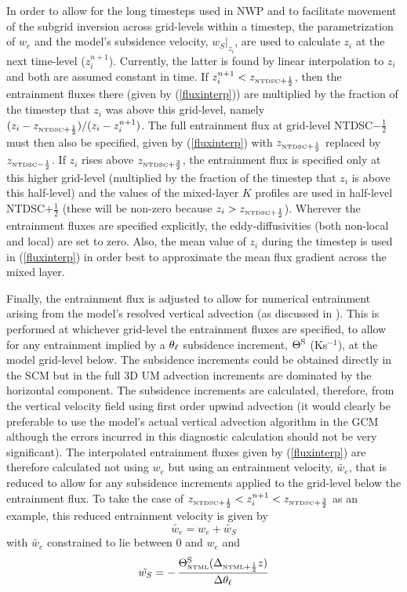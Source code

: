 \documentclass{UMDP_article}
\begin{document}
In order to allow for the long timesteps used in NWP and to facilitate
movement of the subgrid inversion across grid-levels within a
timestep, the parametrization of $w_e$ and the model's subsidence
velocity, $w_S|_{z_i}$, are used to calculate $z_i$ at the next
time-level ($z_i^{n+1}$).  Currently, the latter is found by linear
interpolation to $z_i$ and both are assumed constant in time.  If
$z_i^{n+1} < z_{\mbox{\tiny \rm NTDSC} +\frac{1}{2}}$, then the entrainment fluxes
there (given by (\ref{fluxinterp})) are multiplied by the fraction of
the timestep that $z_i$ was above this grid-level, namely
$(z_i-z_{\mbox{\tiny \rm NTDSC} +\frac{1}{2}})/(z_i - z_i^{n+1}) $.  The full
entrainment flux at grid-level NTDSC$-\frac{1}{2}$ must then also be
specified, given by (\ref{fluxinterp}) with $z_{\mbox{\tiny \rm NTDSC} + \frac{1}{2}}$
replaced by $z_{\mbox{\tiny \rm NTDSC} - \frac{1}{2}}$.  If $z_i$ rises above
$z_{\mbox{\tiny \rm NTDSC}+\frac{3}{2}}$, the entrainment flux is specified only at
this higher grid-level (multiplied by the fraction of the timestep
that $z_i$ is above this half-level) and the values of the mixed-layer
$K$ profiles are used in half-level NTDSC$+\frac{1}{2}$ (these will be
non-zero because $z_i>z_{\mbox{\tiny \rm NTDSC} + \frac{1}{2}}$).  Wherever the
entrainment fluxes are specified explicitly, the eddy-diffusivities
(both non-local and local) are set to zero.  Also, the mean value of
$z_i$ during the timestep is used in (\ref{fluxinterp}) in order best
to approximate the mean flux gradient across the mixed layer.

Finally, the entrainment flux is adjusted to allow for numerical
entrainment arising from the model's resolved vertical advection (as
discussed in \cite{lock01}).  This is performed at whichever
grid-level the entrainment fluxes are specified, to allow for any
entrainment implied by a $\theta_{\ell}$ subsidence increment, $\Theta^{\rm
  S}$ (Ks$^{-1}$), at the model grid-level below.  The subsidence
increments could be obtained directly in the SCM but in the full 3D UM
advection increments are dominated by the horizontal component.  The
subsidence increments are calculated, therefore, from the vertical
velocity field using first order upwind advection (it would clearly be
preferable to use the model's actual vertical advection algorithm in
the GCM although the errors incurred in this diagnostic calculation
should not be very significant).  The interpolated entrainment fluxes
given by (\ref{fluxinterp}) are therefore calculated not using $w_e$
but using an entrainment velocity, $\tilde{w_e}$, that is reduced to
allow for any subsidence increments applied to the grid-level below
the entrainment flux.  To take the case of $z_{\mbox{\tiny \rm NTDSC}+\frac{1}{2}} <
z_i^{n+1} < z_{\mbox{\tiny \rm NTDSC}+\frac{3}{2}}$ as an example, this reduced
entrainment velocity is given by
\begin{equation*}
  \tilde{w_e} = w_e + \tilde{w_S} 
\end{equation*}
with $\tilde{w_e}$ constrained to lie between 0 and $w_e$ and 
\begin{equation}
  \tilde{w_S} = - \, \frac{ \Theta^{\rm S}_{\mbox{\tiny \rm NTML}}
    ( \Delta_{\mbox{\tiny \rm NTML}+\frac{1}{2}} z ) }
  { \Delta \theta_{\ell} }
  \label{we_num}
\end{equation}
\end{document}
